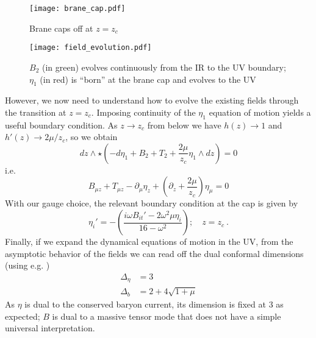 \documentclass[aps,preprint,nofootinbib,preprintnumbers,eqsecnum,superscriptaddress]{revtex4}
\begin{document}
\begin{figure}[!ht]
	\texttt{[image: brane\_cap.pdf]}
	\caption{Brane caps off at $z = z_c$}\label{brane cap}
\end{figure}

\begin{figure}[!ht]
	\texttt{[image: field\_evolution.pdf]}
	\caption{$B_2$ (in green) evolves continuously from the IR to the UV boundary; $\eta_1$ (in red) is ``born'' at the brane cap and evolves to the UV}
\end{figure}

However, we now need to understand how to evolve the existing fields through the transition at $z = z_c$. Imposing continuity of the $\eta_1$ equation of motion yields a useful boundary condition. As $z \to z_c$ from below we have $h(z) \to 1$ and $h'(z) \to 2\mu/z_c$, so we obtain
\begin{equation*}
	dz \wedge \star \left(-d\eta_1 + B_2 + T_2 + \frac{2 \mu}{z_c} \eta_1 \wedge dz\right) = 0
\end{equation*}
i.e.
\begin{equation}
	B_{\mu z} + T_{\mu z} - \partial_\mu \eta_z + \left(\partial_z + \frac{2\mu}{z_c}\right) \eta_\mu = 0
\end{equation}
With our gauge choice, the relevant boundary condition at the cap is given by 
\begin{equation}
	\eta_i' = - \left(\frac{i \omega B_{it}' - 2 \omega^2 \mu \eta_i}{16 - \omega^2}\right); \quad z = z_c \ . 
\end{equation}
Finally, if we expand the dynamical equations of motion in the UV, from the asymptotic behavior of the fields we can read off the dual conformal dimensions (using e.g. \cite{CasalderreySolana:2011us})
\begin{subequations}
	\begin{align}
		\Delta_{\eta} &= 3		\\
		\Delta_{b}	&= 2 + 4 \sqrt{1+\mu}
	\end{align}
\end{subequations}
As $\eta$ is dual to the conserved baryon current, its dimension is fixed at $3$ as expected; $B$ is dual to a massive tensor mode that does not have a simple universal interpretation. 
\end{document}
